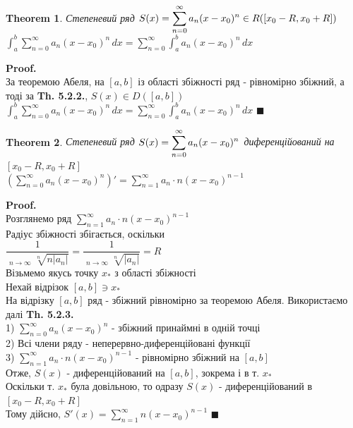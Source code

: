 \documentclass[a4paper, 14pt]{extarticle}
\DeclareMathOperator*\uplim{\overline{lim}}
\def\huge{\displaystyle}
\def\bigline{\vspace{5mm}\\}
\theoremstyle{theoremdd}
\newtheorem{theorem}{Theorem}[subsection]
\theoremstyle{theoremdd}
\theoremstyle{theoremdd}
\theoremstyle{theoremdd}
\theoremstyle{theoremdd}
\theoremstyle{theoremdd}
\theoremstyle{theoremdd}
\theoremstyle{theoremdd}
\newenvironment{pf}{\vspace*{-3mm} \textbf{Proof. \\}}{$\blacksquare$}
\begin{document}
\begin{theorem}
Степеневий ряд $\huge S(x) = \sum_{n=0}^\infty a_n(x-x_0)^n \\ \in R([x_0-R,x_0+R])$\\
$\huge \int_a^b \sum_{n=0}^\infty a_n(x-x_0)^n \,dx = \sum_{n=0}^\infty \int_a^b a_n(x-x_0)^n \,dx$
\end{theorem}

\begin{pf}
За теоремою Абеля, на $[a,b]$ із області збіжності ряд - рівномірно збіжний, а тоді за \textbf{Th. 5.2.2.}, $S(x) \in D([a,b])$\\
$\huge \int_a^b \sum_{n=0}^\infty a_n(x-x_0)^n \,dx = \sum_{n=0}^\infty \int_a^b a_n(x-x_0)^n \,dx$
\end{pf}

\begin{theorem}
Степеневий ряд $\huge S(x) = \sum_{n=0}^\infty a_n(x-x_0)^n \\ $ диференційований на $[x_0-R,x_0+R]$\\
$\huge \left( \sum_{n=0}^\infty a_n(x-x_0)^n \right)' = \sum_{n=1}^\infty a_n\cdot n(x-x_0)^{n-1}$
\end{theorem}

\begin{pf}
Розглянемо ряд $\huge \sum_{n=1}^\infty a_n\cdot n(x-x_0)^{n-1}$\\
Радіус збіжності збігається, оскільки\\
$ \dfrac{1}{\huge \uplim_{n \to \infty} \sqrt[n]{n |a_n|}} = \dfrac{1}{\huge \uplim_{n \to \infty} \sqrt[n]{|a_n|}} = R$\\
Візьмемо якусь точку $x_*$ з області збіжності\\
Нехай відрізок $[a,b] \ni x_*$\\
На відрізку $[a,b]$ ряд - збіжний рівномірно за теоремою Абеля. Використаємо далі \textbf{Th. 5.2.3.}\\
1) $\huge \sum_{n=0}^\infty a_n(x-x_0)^n$ - збіжний принаймні в одній точці\\
2) Всі члени ряду - неперервно-диференційовані функції\\
3) $\huge \sum_{n=1}^\infty a_n \cdot n(x-x_0)^{n-1}$ - рівномірно збіжний на $[a,b]$\\
Отже, $S(x)$ - диференційований на $[a,b]$, зокрема і в т. $x_*$\\
Оскільки т. $x_*$ була довільною, то одразу $S(x)$ - диференційований в $[x_0-R,x_0+R]$\\
Тому дійсно, $S'(x) = \huge \sum_{n=1}^\infty n(x-x_0)^{n-1}$
\end{pf}
\bigline
\end{document}
